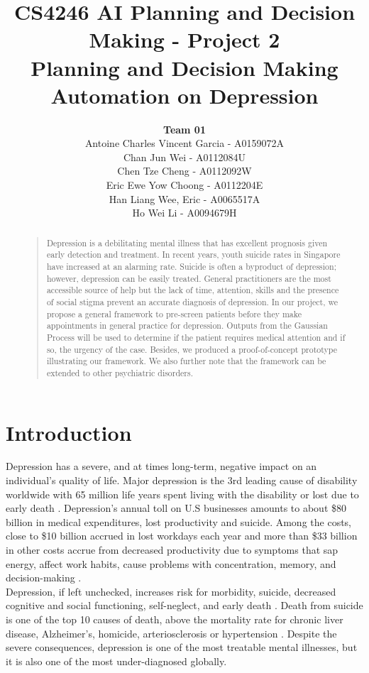 \documentclass{article}
\title{
	CS4246 AI Planning and Decision Making - Project 2 \\
	Planning and Decision Making Automation on Depression
}
\author{
	{\bf Team 01} \\
	Antoine Charles Vincent Garcia - A0159072A\\
	Chan Jun Wei - A0112084U\\
	Chen Tze Cheng - A0112092W\\
	Eric Ewe Yow Choong - A0112204E\\
	Han Liang Wee, Eric - A0065517A\\
	Ho Wei Li - A0094679H\\
}
\begin{document}
 	\maketitle

	\begin{abstract}
	\begin{quote}
	Depression is a debilitating mental illness that has excellent prognosis given early detection and treatment. In recent years, youth suicide rates in Singapore have increased at an alarming rate. Suicide is often a byproduct of depression; however, depression can be easily treated. General practitioners are the most accessible source of help but the lack of time, attention, skills and the presence of social stigma prevent an accurate diagnosis of depression. In our project, we propose a general framework to pre-screen patients before they make appointments in general practice for depression. Outputs from the Gaussian Process will be used to determine if the patient requires medical attention and if so, the urgency of the case. Besides, we produced a proof-of-concept prototype illustrating our framework. We also further note that the framework can be extended to other psychiatric disorders.\\
	\end{quote}
	\end{abstract}
	
	\section{Introduction}
	Depression has a severe, and at times long-term, negative impact on an individual's quality of life. 
    Major depression is the 3rd leading cause of disability worldwide with 65 million life years spent living with the disability or lost due to early death \cite{who2004}. Depression's annual toll on U.S businesses amounts to about \$80 billion in medical expenditures, lost productivity and suicide. Among the costs, close to \$10 billion accrued in lost workdays each year and more than \$33 billion in other costs accrue from decreased productivity due to symptoms that sap energy, affect work habits, cause problems with concentration, memory, and decision-making \cite{tjcp2015}. \\

	Depression, if left unchecked, increases risk for morbidity, suicide, decreased cognitive and social functioning, self-neglect, and early death \cite{arcp2009}. Death from suicide is one of the top 10 causes of death, above the mortality rate for chronic liver disease, Alzheimer's, homicide, arteriosclerosis or hypertension \cite{nvsr2016}. Despite the severe consequences, depression is one of the most treatable mental illnesses, but it is also one of the most under-diagnosed globally. \\
\end{document}
